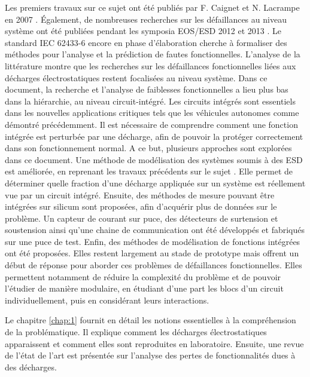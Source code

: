 Les premiers travaux sur ce sujet ont été publiés par F. Caignet et N. Lacrampe en 2007 \cite{LacrampeTransientImmunity}.
Également, de nombreuses recherches sur les défaillances au niveau système ont été publiées pendant les symposia EOS/ESD 2012 \cite{soft-error-esd-1,SDRAMCase,mixedModeESDSims} et 2013 \cite{softFailSubsystem, powered-tlp-soft-fail}.
Le standard IEC 62433-6 \cite{iec62433-6} encore en phase d'élaboration cherche à formaliser des méthodes pour l'analyse et la prédiction de fautes fonctionnelles.
L'analyse de la littérature montre que les recherches sur les défaillances fonctionnelles liées aux décharges électrostatiques restent focalisées au niveau système.
Dans ce document, la recherche et l'analyse de faiblesses fonctionnelles a lieu plus bas dans la hiérarchie, au niveau circuit-intégré.
Les circuits intégrés sont essentiels dans les nouvelles applications critiques tels que les véhicules autonomes comme démontré précédemment.
Il est nécessaire de comprendre comment une fonction intégrée est perturbée par une décharge, afin de pouvoir la protéger correctement dans son fonctionnement normal.
A ce but, plusieurs approches sont explorées dans ce document.
Une méthode de modélisation des systèmes soumis à des ESD est améliorée, en reprenant les travaux précédents sur le sujet \cite{phd-lacrampe, phd-monnereau}.
Elle permet de déterminer quelle fraction d'une décharge appliquée sur un système est réellement vue par un circuit intégré.
Ensuite, des méthodes de mesure pouvant être intégrées sur silicum sont proposées, afin d'acquérir plus de données sur le problème.
Un capteur de courant sur puce, des détecteurs de surtension et soustension ainsi qu'une chaine de communication ont été développés et fabriqués sur une puce de test.
Enfin, des méthodes de modélisation de fonctions intégrées ont été proposées.
Elles restent largement au stade de prototype mais offrent un début de réponse pour aborder ces problèmes de défaillances fonctionnelles.
Elles permettent notamment de réduire la complexité du problème et de pouvoir l'étudier de manière modulaire, en étudiant d'une part les blocs d'un circuit individuellement, puis en considérant leurs interactions.

%
Le chapitre \ref{chap:1} fournit en détail les notions essentielles à la compréhension de la problématique.
Il explique comment les décharges électrostatiques apparaissent et comment elles sont reproduites en laboratoire.
Ensuite, une revue de l'état de l'art est présentée sur l'analyse des pertes de fonctionnalités dues à des décharges.

